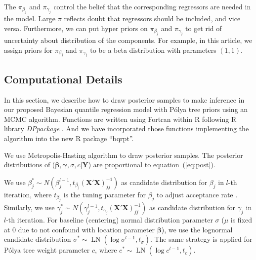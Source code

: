 \documentclass[12pt]{article}
\newcommand{\polya}{P\'{o}lya}
\DeclareMathOperator{\LN}{LN}
\begin{document}
The $\pi_{\beta_j}$ and $\pi_{\gamma_j}$ control the belief that the
corresponding regressors are needed in the model. Large $\pi$ reflects
doubt that regressors should be included, and vice versa. Furthermore,
we can put hyper priors on $\pi_{\beta_j}$ and $\pi_{\gamma_j}$ to get
rid of uncertainty about distribution of the components.  For example,
in this article, we assign priors for $\pi_{\beta_j}$ and
$\pi_{\gamma_j}$ to be a beta distribution with parameters $(1,1)$.

\subsection{Computational Details}\label{sec:computation}

In this section, we describe how to draw posterior samples to make
inference in our proposed Bayesian quantile regression model with
\polya{} tree priors using an MCMC algorithm. Functions are written
using Fortran within R \citep{R} following R library
\textit{DPpackage} \citep{DPpackage}. And we have incorporated those
functions implementing the algorithm into the new R \citep{R} package
``bqrpt''.

We use Metropolis-Hasting algorithm to draw posterior samples. The
posterior distributions of ($\bm \beta, \bm \gamma, \sigma, c | \bm
Y$) are proportional to equation~(\ref{eq:post}).

We use $\beta_j^* \sim N(\beta_j^{l-1}, t_{\beta_j}
(\bm{X'X})^{-1}_{jj})$ as candidate distribution for $\beta_j$ in
$l$-th iteration, where $t_{\beta_j}$ is the tuning parameter for
$\beta_j$ to adjust acceptance rate \citep{jara2009}.  Similarly, we
use $\gamma_j^* \sim N(\gamma_j^{l-1},
t_{\gamma_j}(\bm{X'X})^{-1}_{jj})$ as candidate distribution for
$\gamma_j$ in $l$-th iteration.  For baseline (centering) normal
distribution parameter $\sigma$ ($\mu$ is fixed at 0 due to not
confound with location parameter $\bm \beta$), we use the lognormal
candidate distribution $\sigma^* \sim \LN(\log \sigma^{l-1},
t_{\sigma})$. The same strategy is applied for \polya{} tree weight
parameter $c$, where $c^* \sim \LN(\log c^{l-1}, t_c)$.
\end{document}
